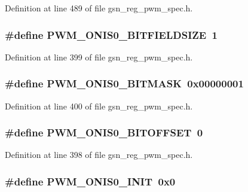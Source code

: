 Definition at line 489 of file gsn\_\-reg\_\-pwm\_\-spec.h.

\hypertarget{a00565_af2887ed7f985bc0d495de8817e5902ec}{
\subsubsection[{PWM\_\-ONIS0\_\-BITFIELDSIZE}]{\setlength{\rightskip}{0pt plus 5cm}\#define PWM\_\-ONIS0\_\-BITFIELDSIZE~1}}
\label{a00565_af2887ed7f985bc0d495de8817e5902ec}


Definition at line 399 of file gsn\_\-reg\_\-pwm\_\-spec.h.

\hypertarget{a00565_aaf610b0cb59d94f8b80e62bb8fe11bfc}{
\subsubsection[{PWM\_\-ONIS0\_\-BITMASK}]{\setlength{\rightskip}{0pt plus 5cm}\#define PWM\_\-ONIS0\_\-BITMASK~0x00000001}}
\label{a00565_aaf610b0cb59d94f8b80e62bb8fe11bfc}


Definition at line 400 of file gsn\_\-reg\_\-pwm\_\-spec.h.

\hypertarget{a00565_a848aae31bbabab473111b05aa885af1e}{
\subsubsection[{PWM\_\-ONIS0\_\-BITOFFSET}]{\setlength{\rightskip}{0pt plus 5cm}\#define PWM\_\-ONIS0\_\-BITOFFSET~0}}
\label{a00565_a848aae31bbabab473111b05aa885af1e}


Definition at line 398 of file gsn\_\-reg\_\-pwm\_\-spec.h.

\hypertarget{a00565_a8f6965d1e884e33dc231898c6d833cd3}{
\subsubsection[{PWM\_\-ONIS0\_\-INIT}]{\setlength{\rightskip}{0pt plus 5cm}\#define PWM\_\-ONIS0\_\-INIT~0x0}}
\label{a00565_a8f6965d1e884e33dc231898c6d833cd3}


